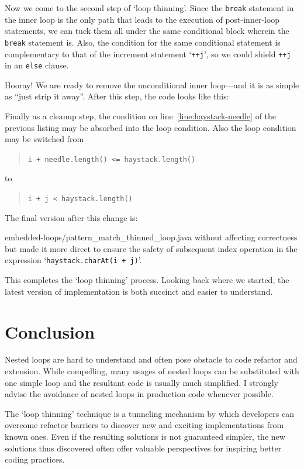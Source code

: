\documentclass[oneside,11pt]{book}
\theoremstyle{definition}
\theoremstyle{remark}
\newcommand{\code}[1]{\mbox{\lstinline{#1}}}
\begin{document}
Now we come to the second step of `loop thinning'.
Since the \code{break} statement in the inner loop is the only path that leads to the
execution of post-inner-loop statements, we can tuck them all under the same
conditional block wherein the \code{break} statement is.
Also, the condition for the same conditional statement is complementary to that of the
increment statement `\code{++j}', so we could shield \code{++j} in an \code{else} clause.


Hooray!
We are ready to remove the unconditional inner loop---and it is as simple as ``just strip it away''.
After this step, the code looks like this:

Finally as a cleanup step, the condition on line~\ref{line:haystack-needle} of the previous listing
may be absorbed into the loop condition.
Also the loop condition may be switched from
\begin{quote}
\code{i + needle.length() <= haystack.length()}
\end{quote}
to
\begin{quote}
\code{i + j < haystack.length()}
\end{quote}
The final version after this change is:

{embedded-loops/pattern_match_thinned_loop.java}
without affecting correctness but made it more direct to ensure the safety of subsequent index
operation in the expression `\code{haystack.charAt(i + j)}'.

This completes the `loop thinning' process.
Looking back where we started, the latest version of implementation is both succinct and easier to
understand.


\section{Conclusion}\label{sec:loop-push-up-conclusion}




Nested loops are hard to understand and often pose obstacle to code refactor and extension.
While compelling, many usages of nested loops can be
substituted with one simple loop and the resultant code is usually much simplified.
I strongly advise the avoidance of nested loops in production code whenever possible.


The `loop thinning' technique is a tunneling mechanism by which developers can overcome
refactor barriers to discover new and exciting implementations from known ones.
Even if the resulting solutions is not guaranteed simpler, the new solutions thus discovered often
offer valuable perspectives for inspiring better coding practices.
\clearpage{}
    \clearpage{}
\end{document}
